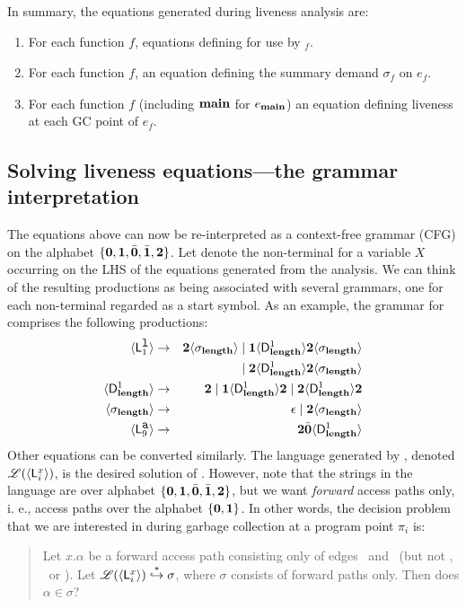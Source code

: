 \documentclass[9pt]{sigplanconf}
\begin{document}
In summary, the equations generated during liveness analysis are:
\begin{enumerate}
\item For each function $\mathit{f}$, equations defining  for
  use by \Lfonly$_{\mathit f}$.
\item For each function $\mathit{f}$, an equation defining the summary
  demand $\sigma_{\mathit f}$ on $e_f$.
\item  For  each  function   $\mathit{f}$  (including  $\mathbf{main}$  for
  $e_{\mathbf{main}}$)  an equation  defining liveness  at each  GC point  of
  $e_{\mathit f}$.
\end{enumerate}
\subsection{Solving liveness equations---the grammar
interpretation}\label{sec:grammar-formulation}
The  equations above can now be re-interpreted as a
context-free grammar (CFG)  on the alphabet $\lbrace\mathbf{0}, \mathbf{1},
\bar{\mathbf{0}}, \bar{\mathbf{1}}, {\mathbf{2}}\rbrace$.  Let   denote the non-terminal
for
a variable  $X$ occurring on  the LHS of the  equations generated
from the analysis.  We can  think of the resulting productions as
being associated with several  grammars, one for each non-terminal
 regarded as a start symbol.  As an example, the
grammar    for      comprises    the   following
productions:
\begin{eqnarray*}
  \langle \mathsf{L}_{{1}}^{\mbox{\tt l}}\rangle  &\rightarrow& 
  {\mathbf{2}}\langle \sigma_{\mathbf{length}}\rangle \mid \mathbf{1} \langle \mathsf{D}_{\mathit {\mathbf{length}}}^{1}\rangle{\ensuremath{{\mathbf{2}}}\ensuremath{\langle \sigma_{\mathbf{length}}\rangle}}  \\
  & & \mid
  {\mathbf{2}}\langle \mathsf{D}_{\mathit {\mathbf{length}}}^{1}\rangle{\ensuremath{{\mathbf{2}}}\ensuremath{\langle \sigma_{\mathbf{length}}\rangle}} \\
  \langle \mathsf{D}_{\mathit {\mathbf{length}}}^{1}\rangle &\rightarrow& {\mathbf{2}} \mid
  \mathbf{1}\langle \mathsf{D}_{\mathit {\mathbf{length}}}^{1}\rangle{\mathbf{2}}
       \mid {\mathbf{2}}\langle \mathsf{D}_{\mathit {\mathbf{length}}}^{1}\rangle{\ensuremath{{\mathbf{2}}}}\\
\langle {\sigma_{\ensuremath{\mathbf{length}}}} \rangle
&\rightarrow&
\epsilon  \mid {\mathbf{2}}\langle{\sigma_{\ensuremath{\mathbf{length}}}}\rangle \\
\langle \mathsf{L}_{{9}}^{\mbox{\tt a}}\rangle &\rightarrow& {\mathbf{2}} \bar{\mathbf{0}} \langle \mathsf{D}_{\mathit {\mathbf{length}}}^{1}\rangle
\end{eqnarray*}
Other equations can be converted similarly.  The language generated by
,  denoted  $\mathscr{L}(\langle \mathsf{L}_{{i}}^{x}\rangle)$, is  the
desired solution  of .  However,  note that the  strings in
the  language are  over alphabet  $\lbrace \mathbf{0},  \mathbf{1},\bar{\mathbf{0}}, \bar{\mathbf{1}},
{\mathbf{2}} \rbrace$, but  we want {\em forward} access paths  only, i. e.,
access paths over the alphabet $\lbrace \mathbf{0}, \mathbf{1} \rbrace$. In
other words,  the decision  problem that we  are interested  in during
garbage collection at a program point $\pi_i$ is:
\begin{quote}
Let  $x.\alpha$ be  a forward  access  path consisting  only of  edges
\acar\    and   \acdr\    (but    not   \bcar, \bcdr\ or \clazy).     Let
$\mathscr{L}(\langle \mathsf{L}_{{i}}^{x}\rangle) \stackrel{*}{\hookrightarrow} \sigma$,
where $\sigma$ consists  of forward paths only. Then  does $\alpha \in
\sigma$?
\end{quote}
\end{document}

